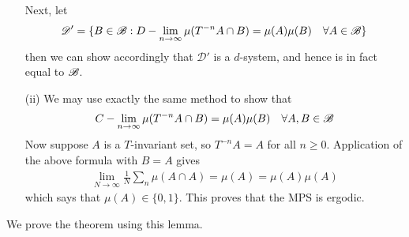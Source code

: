\documentclass[12pt,a4paper]{report}
\newenvironment{proof}
{\begin{changemargin}{1cm}{0.5cm} 
	}%
	{\end{changemargin}
}
\begin{document}
\begin{proof}
\begin{itemize}
\quad Next, let 
\begin{align*}
\mathscr{D}' = \{B\in \mathscr{B} : D-\lim_{n\rightarrow \infty} \mu(T^{-n} A \cap B) = \mu(A) \mu(B) \quad \forall A\in \mathscr{B} \}
\end{align*}
then we can show accordingly that $\mathscr{D}'$ is a $d$-system, and hence is in fact equal to $\mathscr{B}$.
\item[(ii)] We may use exactly the same method to show that
\begin{align*}
C-\lim_{n\rightarrow \infty} \mu(T^{-n}A \cap B) = \mu(A) \mu(B) \quad \forall A,B \in \mathscr{B}
\end{align*}
Now suppose $A$ is a $T$-invariant set, so $T^{-n} A = A$ for all $n\geq 0$. Application of the above formula with $B=A$ gives
\begin{align*}
\lim_{N\rightarrow \infty} \frac{1}{N}\sum_{n}\mu(A \cap A) = \mu(A) = \mu(A)\mu(A)
\end{align*}
which says that $\mu(A) \in \{0,1\}$. This proves that the MPS is ergodic.
\end{itemize}
\eop
\end{proof}
\s

We prove the theorem using this lemma.
\end{document}
